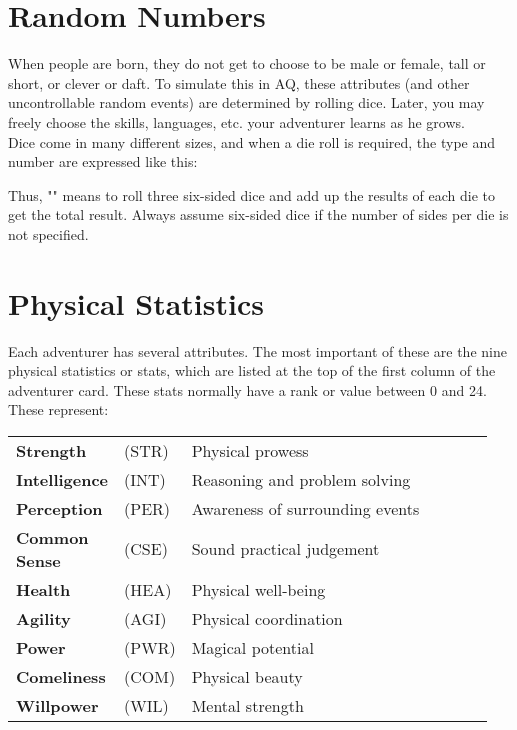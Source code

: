 \begin{multicols*}{2}
\section{Random Numbers}
When people are born, they do not get to choose to be male or female, tall or short, or clever or daft. To simulate this in AQ, these attributes (and other uncontrollable random events) are determined by rolling dice. Later, you may freely choose the skills, languages, etc. your adventurer learns as he grows.\\
Dice come in many different sizes, and when a die roll is required, the type and number are expressed like this:\\
\begin{center}
\end{center}
Thus, "" means to roll three six-sided dice and add up the results of each die to get the total result. Always assume six-sided dice if the number of sides per die is not specified.
\section{Physical Statistics}
Each adventurer has several attributes. The most important of these are the nine physical statistics or stats, which are listed at the top of the first column of the adventurer card. These stats normally have a rank or value between 0 and 24. These represent:

\noindent\begin{tabular}{@{}p{0.2\linewidth} p{0.1\linewidth} p{0.65\linewidth}}
\textbf{Strength} & (STR) & Physical prowess\\
\textbf{Intelligence} & (INT) & Reasoning and problem solving\\
\textbf{Perception} & (PER) & Awareness of surrounding events\\
\textbf{Common Sense} & (CSE) & Sound practical judgement\\
\textbf{Health} & (HEA) & Physical well-being\\
\textbf{Agility} & (AGI) & Physical coordination\\
\textbf{Power} &  (PWR) &  Magical potential\\
\textbf{Comeliness} & (COM) & Physical beauty\\
\textbf{Willpower} & (WIL) & Mental strength\\
\end{tabular}


\end{multicols*}
